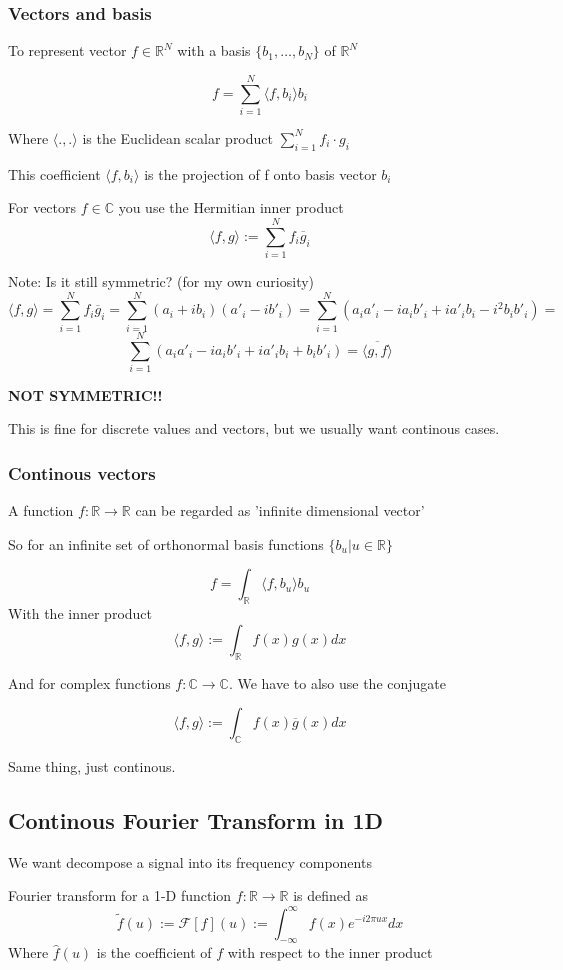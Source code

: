 \documentclass{article}
\begin{document}
\subsubsection{Vectors and basis}
To represent vector $f\in\mathbb{R}^N$ with a basis $\{b_1,\dots,b_N\}$ of $\mathbb{R}^N$

\[f = \sum_{i=1}^{N}\langle f,b_i \rangle b_i\]

Where $\langle .,. \rangle$ is the Euclidean scalar product $\sum_{i=1}^{N}f_i\cdot g_i$

This coefficient $\langle f,b_i \rangle$ is the projection of f onto basis vector $b_i$

For vectors $f\in\mathbb{C}$ you use the Hermitian inner product
\[\langle f,g \rangle := \sum_{i=1}^{N}f_i\overline{g}_i\]

Note: Is it still symmetric? (for my own curiosity)
\[\langle f,g \rangle = \sum_{i=1}^{N}f_i\overline{g}_i = \sum_{i=1}^{N}(a_i + ib_i)(a'_i - ib'_i) = \sum_{i=1}^{N}(a_ia'_i - ia_ib'_i + ia'_ib_i - i^2b_ib'_i) = \]
\[\sum_{i=1}^{N}(a_ia'_i - ia_ib'_i + ia'_ib_i + b_ib'_i) =  \overline{\langle g,f \rangle}\]

\textbf{NOT SYMMETRIC!!}


This is fine for discrete values and vectors, but we usually want continous cases.

\subsubsection{Continous vectors}
A function $f:\mathbb{R}\to\mathbb{R}$ can be regarded as 'infinite dimensional vector'

So for an infinite set of orthonormal basis functions $\{b_u | u\in\mathbb{R}\}$

\[f = \int_\mathbb{R} \langle f,b_u\rangle b_u\]
With the inner product 
\[\langle f,g \rangle := \int_\mathbb{R}f(x)g(x)dx\]

And for complex functions $f:\mathbb{C}\to\mathbb{C}$. We have to also use the conjugate

\[\langle f,g \rangle := \int_\mathbb{C}f(x)\overline{g}(x)dx\]

Same thing, just continous.
\subsection{Continous Fourier Transform in 1D}
We want decompose a signal into its frequency components


Fourier transform for a 1-D function $f:\mathbb{R}\to\mathbb{R}$ is defined as
\[\tilde{f}(u) := \mathcal{F}[f](u) := \int_{-\infty}^\infty f(x)e^{-i2\pi u x}dx\]
Where $\hat{f}(u)$ is the coefficient of $f$ with respect to the inner product
\end{document}
